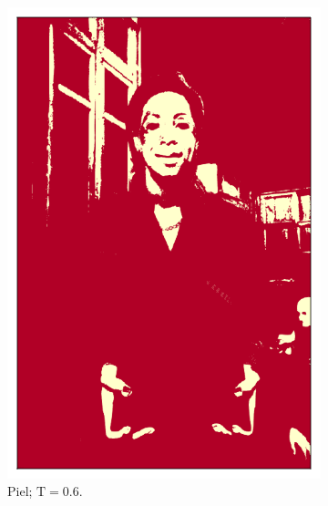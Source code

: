 \begin{figure}[ht!]
\begin{subfigure}[t]{0.2\textwidth}
        \includegraphics[width=\textwidth]{../figures/image2/image_02_treshskin_60percent.png}
        \caption{Piel; $\text{T} = 0.6$.}
    \end{subfigure}
    \hspace{0.25cm}
    \begin{subfigure}[t]{0.2\textwidth}
        \centering

\end{subfigure}
\end{figure}
